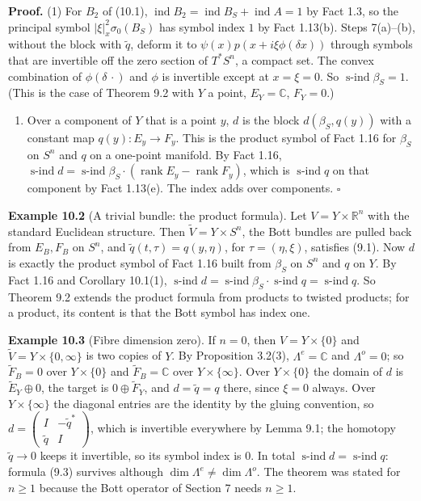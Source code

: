 \documentclass[
  11pt,
]{article}
\providecommand{\tightlist}{%
  \setlength{\itemsep}{0pt}\setlength{\parskip}{0pt}}
\begin{document}
\textbf{Proof.} (1) For \(B_2\) of (10.1),
\(\operatorname{ind}B_2=\operatorname{ind}B_S+\operatorname{ind}A=1\) by
Fact 1.3, so the principal symbol \(|\xi|_x^2\sigma_0(B_S)\) has symbol
index \(1\) by Fact 1.13(b). Steps 7(a)--(b), without the block with
\(\tilde q\), deform it to \(\psi(x)p(x+i\xi\phi(\delta x))\) through
symbols that are invertible off the zero section of \(T^*S^n\), a
compact set. The convex combination of \(\phi(\delta\,\cdot)\) and
\(\phi\) is invertible except at \(x=\xi=0\). So
\(\operatorname{s-ind}\beta_S=1\). (This is the case of Theorem 9.2 with
\(Y\) a point, \(E_Y=\mathbb C\), \(F_Y=0\).)

\begin{enumerate}
\def\labelenumi{(\arabic{enumi})}
\setcounter{enumi}{1}
\tightlist
\item
  Over a component of \(Y\) that is a point \(y\), \(d\) is the block
  \(d(\beta_S,q(y))\) with a constant map \(q(y):E_y\to F_y\). This is
  the product symbol of Fact 1.16 for \(\beta_S\) on \(S^n\) and \(q\)
  on a one-point manifold. By Fact 1.16,
  \(\operatorname{s-ind}d=\operatorname{s-ind}\beta_S\cdot(\operatorname{rank}E_y-\operatorname{rank}F_y)\),
  which is \(\operatorname{s-ind}q\) on that component by Fact 1.13(e).
  The index adds over components. \(\square\)
\end{enumerate}

\textbf{Example 10.2} (A trivial bundle: the product formula). Let
\(V=Y\times\mathbb R^n\) with the standard Euclidean structure. Then
\(\tilde V=Y\times S^n\), the Bott bundles are pulled back from
\(E_B,F_B\) on \(S^n\), and \(\tilde q(t,\tau)=q(y,\eta)\), for
\(\tau=(\eta,\xi)\), satisfies (9.1). Now \(d\) is exactly the product
symbol of Fact 1.16 built from \(\beta_S\) on \(S^n\) and \(q\) on
\(Y\). By Fact 1.16 and Corollary 10.1(1),
\(\operatorname{s-ind}d=\operatorname{s-ind}\beta_S\cdot\operatorname{s-ind}q=\operatorname{s-ind}q\).
So Theorem 9.2 extends the product formula from products to twisted
products; for a product, its content is that the Bott symbol has index
one.

\textbf{Example 10.3} (Fibre dimension zero). If \(n=0\), then
\(V=Y\times\{0\}\) and \(\tilde V=Y\times\{0,\infty\}\) is two copies of
\(Y\). By Proposition 3.2(3), \(\Lambda^e=\mathbb C\) and
\(\Lambda^o=0\); so \(\tilde F_B=0\) over \(Y\times\{0\}\) and
\(\tilde F_B=\mathbb C\) over \(Y\times\{\infty\}\). Over
\(Y\times\{0\}\) the domain of \(d\) is \(\tilde E_Y\oplus0\), the
target is \(0\oplus\tilde F_Y\), and \(d=\tilde q=q\) there, since
\(\xi=0\) always. Over \(Y\times\{\infty\}\) the diagonal entries are
the identity by the gluing convention, so
\(d=\begin{pmatrix}I&-\tilde q^*\\ \tilde q&I\end{pmatrix}\), which is
invertible everywhere by Lemma 9.1; the homotopy \(\tilde q\to0\) keeps
it invertible, so its symbol index is \(0\). In total
\(\operatorname{s-ind}d=\operatorname{s-ind}q\): formula (9.3) survives
although \(\dim\Lambda^e\ne\dim\Lambda^o\). The theorem was stated for
\(n\ge1\) because the Bott operator of Section 7 needs \(n\ge1\).
\end{document}
